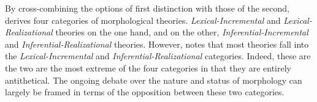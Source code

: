 %

By cross-combining the options of first distinction with those of the second, 
\cite{stump:2001} derives four categories of morphological theories. 
\emph{Lexical-Incremental} and \emph{Lexical-Realizational} theories 
on the one hand, and on the other, \emph{Inferential-Incremental} and 
\emph{Inferential-Realizational} theories. However, \citep{anderson:2017} 
notes that most theories fall into the \emph{Lexical-Incremental} and 
\emph{Inferential-Realizational} categories. Indeed, these are the two are 
the most extreme of the four categories in that they are entirely antithetical. 
The ongoing debate over the nature and status of morphology can largely 
be framed in terms of the opposition between these two categories. 

